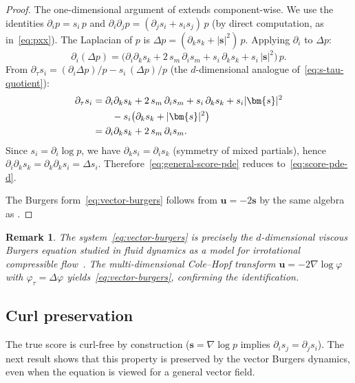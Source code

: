 \documentclass[11pt]{article}
\newtheorem{remark}[theorem]{Remark}
\begin{document}
\begin{proof}
The one-dimensional argument of  extends component-wise.
We use the identities $\partial_i p = s_i\,p$ and $\partial_i \partial_j p = (\partial_j s_i + s_i s_j)\,p$ (by direct computation, as in~\eqref{eq:pxx}).
The Laplacian of $p$ is $\Delta p = (\partial_k s_k + |\bm{s}|^2)\,p$.
Applying $\partial_i$ to $\Delta p$:
\begin{equation}\label{eq:partial-i-laplacian}
  \partial_i(\Delta p)
  = \bigl(\partial_i \partial_k s_k + 2\,s_m\,\partial_i s_m + s_i\,\partial_k s_k + s_i\,|\bm{s}|^2\bigr)\,p.
\end{equation}
From $\partial_\tau s_i = (\partial_i \Delta p)/p - s_i\,(\Delta p)/p$ (the $d$-dimensional analogue of~\eqref{eq:s-tau-quotient}):
\begin{align}
  \partial_\tau s_i
  &= \partial_i\partial_k s_k + 2\,s_m\,\partial_i s_m + s_i\,\partial_k s_k + s_i|\bm{s}|^2 \\
  &\qquad - s_i\bigl(\partial_k s_k + |\bm{s}|^2\bigr)\notag\\
  &= \partial_i\partial_k s_k + 2\,s_m\,\partial_i s_m.\label{eq:general-score-pde}
\end{align}
Since $s_i = \partial_i \log p$, we have $\partial_k s_i = \partial_i s_k$ (symmetry of mixed partials), hence $\partial_i \partial_k s_k = \partial_k \partial_k s_i = \Delta s_i$.
Therefore~\eqref{eq:general-score-pde} reduces to~\eqref{eq:score-pde-d}.

The Burgers form~\eqref{eq:vector-burgers} follows from $\bm{u} = -2\bm{s}$ by the same algebra as .
\end{proof}

\begin{remark}\label{rem:vector-burgers}
The system~\eqref{eq:vector-burgers} is precisely the $d$-dimensional viscous Burgers equation studied in fluid dynamics as a model for irrotational compressible flow~\citep{whitham1974linear}.
The multi-dimensional Cole--Hopf transform $\bm{u} = -2\nabla\log\varphi$ with $\varphi_\tau = \Delta\varphi$ yields~\eqref{eq:vector-burgers}, confirming the identification.
\end{remark}

\subsection{Curl preservation}\label{sec:md:curl}

The true score is curl-free by construction ($\bm{s} = \nabla\log p$ implies $\partial_i s_j = \partial_j s_i$).
The next result shows that this property is preserved by the vector Burgers dynamics, even when the equation is viewed for a general vector field.
\end{document}

